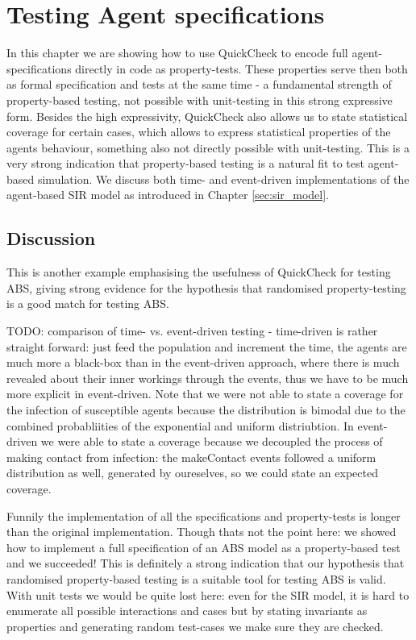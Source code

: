 \chapter{Testing Agent specifications}
\label{ch:agentspec}

In this chapter we are showing how to use QuickCheck to encode full agent-specifications directly in code as property-tests. These properties serve then both as formal specification and tests at the same time - a fundamental strength of property-based testing, not possible with unit-testing in this strong expressive form. Besides the high expressivity, QuickCheck also allows us to state statistical coverage for certain cases, which allows to express statistical properties of the agents behaviour, something also not directly possible with unit-testing. This is a very strong indication that property-based testing is a natural fit to test agent-based simulation. We discuss both time- and event-driven  implementations of the agent-based SIR model as introduced in Chapter \ref{sec:sir_model}.





\section{Discussion}
 This is another example emphasising the usefulness of QuickCheck for testing ABS, giving strong evidence for the hypothesis that randomised property-testing is a good match for testing ABS.
 
TODO: comparison of time- vs. event-driven testing
- time-driven is rather straight forward: just feed the population and increment the time, the agents are much more a black-box than in the event-driven approach, where there is much revealed about their inner workings through the events, thus we have to be much more explicit in event-driven. Note that we were not able to state a coverage for the infection of susceptible agents because the distribution is bimodal due to the combined probabliities of the exponential and uniform distriubtion. In event-driven we were able to state a coverage because we decoupled the process of making contact from infection: the makeContact events followed a uniform distribution as well, generated by oureselves, so we could state an expected coverage.

Funnily the implementation of all the specifications and property-tests is longer than the original implementation. Though thats not the point here: we showed how to implement a full specification of an ABS model as a property-based test and we succeeded! This is definitely a strong indication that our hypothesis that randomised property-based testing is a suitable tool for testing ABS is valid. With unit tests we would be quite lost here: even for the SIR model, it is hard to enumerate all possible interactions and cases but by stating invariants as properties and generating random test-cases we make sure they are checked.

